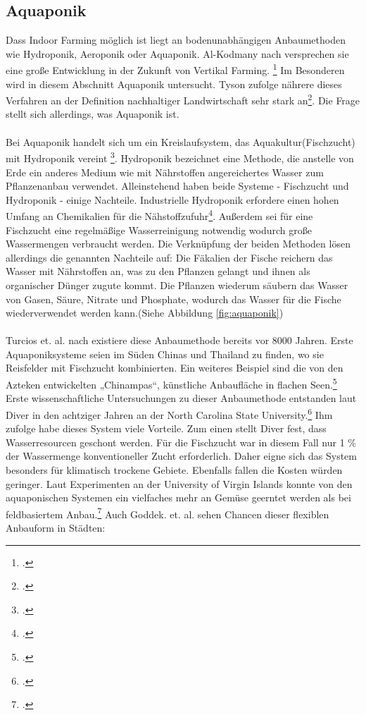 \documentclass{scrartcl}
\begin{document}
\subsection{Aquaponik}
Dass Indoor Farming möglich ist liegt an bodenunabhängigen Anbaumethoden wie Hydroponik, Aeroponik oder Aquaponik. Al-Kodmany nach versprechen sie eine große Entwicklung in der Zukunft von Vertikal Farming. \footcite[S.1]{Al-Kodmany2018TheCity} Im Besonderen wird in diesem Abschnitt Aquaponik untersucht. Tyson zufolge nährere dieses Verfahren an der Definition nachhaltiger Landwirtschaft sehr stark an\footcite[Vgl.][S.36]{TysonV.2007ReconcilingMedium}. Die Frage stellt sich allerdings, was Aquaponik ist.\\
\\
Bei Aquaponik handelt sich um ein Kreislaufsystem, das Aquakultur(Fischzucht) mit Hydroponik vereint \footcite[Vgl.][S.44f]{Spring2012DerBasel-Stadt}. Hydroponik bezeichnet eine Methode, die anstelle von Erde ein anderes Medium wie mit Nährstoffen angereichertes Wasser zum Pflanzenanbau verwendet. Alleinstehend haben beide Systeme - Fischzucht und Hydroponik - einige Nachteile. Industrielle Hydroponik erfordere einen hohen Umfang an Chemikalien für die Nähstoffzufuhr\footcite[Vgl.][S.8]{Al-Kodmany2018TheCity}. Außerdem sei für eine Fischzucht eine regelmäßige Wasserreinigung notwendig wodurch große Wassermengen verbraucht werden. Die Verknüpfung der beiden Methoden lösen allerdings die genannten Nachteile auf: Die Fäkalien der Fische reichern das Wasser mit Nährstoffen an, was zu den Pflanzen gelangt und ihnen als organischer Dünger zugute kommt. Die Pflanzen wiederum säubern das Wasser von Gasen, Säure, Nitrate und Phosphate, wodurch das Wasser für die Fische wiederverwendet werden kann.(Siehe Abbildung \ref{fig:aquaponik}) \\
\\
Turcios et. al. nach existiere diese Anbaumethode bereits vor 8000 Jahren. Erste Aquaponiksysteme seien im Süden Chinas und Thailand zu finden, wo sie Reisfelder mit Fischzucht kombinierten. Ein weiteres Beispiel sind die von den Azteken entwickelten „Chinampas“, künstliche Anbaufläche in flachen Seen.\footcite[Vgl.][S.838]{Turcios2014SustainableFuture} Erste wissenschaftliche Untersuchungen zu dieser Anbaumethode entstanden laut Diver in den achtziger Jahren an der North Carolina State University.\footcite[Vgl.][S.4]{Diver2006Aquaponics-IntegrationAquaculture} 
Ihm zufolge habe dieses System viele Vorteile. Zum einen stellt Diver fest, dass Wasserresourcen geschont werden. Für die Fischzucht war in diesem Fall nur 1 \% der Wassermenge konventioneller Zucht erforderlich. Daher eigne sich das System besonders für klimatisch trockene Gebiete. Ebenfalls fallen die Kosten würden geringer. Laut Experimenten an der University of Virgin Islands konnte von den aquaponischen Systemen ein vielfaches mehr an Gemüse geerntet werden als bei feldbasiertem Anbau.\footcite[Vgl.][S.7f]{Diver2006Aquaponics-IntegrationAquaculture} Auch Goddek. et. al. sehen Chancen dieser flexiblen Anbauform in Städten:
\end{document}

